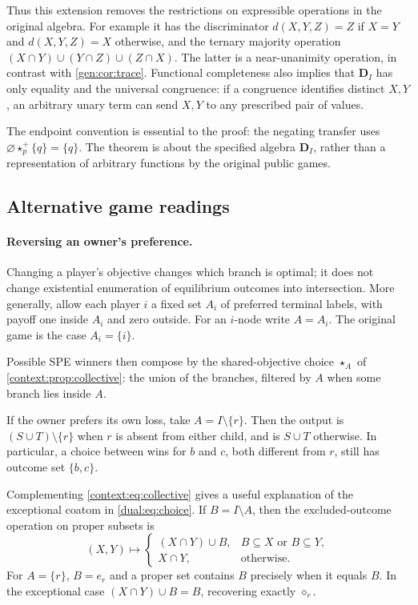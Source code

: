Thus this extension removes the restrictions on expressible operations
in the original algebra. For example it has the discriminator
$d(X,Y,Z)=Z$ if $X=Y$ and $d(X,Y,Z)=X$ otherwise, and the ternary
majority operation
$(X\cap Y)\cup(Y\cap Z)\cup(Z\cap X)$.
The latter is a near-unanimity operation, in contrast with
\cref{gen:cor:trace}. Functional completeness also implies that
$\mathbf D_I$ has only equality and the universal congruence: if a
congruence identifies distinct $X,Y$, an arbitrary unary term can
send $X,Y$ to any prescribed pair of values.

The endpoint convention is essential to the proof: the negating transfer
uses $\varnothing\star_p^+\{q\}=\{q\}$.
The theorem is about the specified algebra $\mathbf D_I$, rather than
a representation of arbitrary functions by the original public games.

\subsection{Alternative game readings}

\paragraph{Reversing an owner's preference.}
Changing a player's objective changes which branch is optimal; it does
not change existential enumeration of equilibrium outcomes into
intersection. More generally, allow each player $i$ a fixed set $A_i$
of preferred terminal labels, with payoff one inside $A_i$ and zero
outside. For an $i$-node write $A=A_i$. The original game is the case
$A_i=\{i\}$.

Possible SPE winners then compose by the shared-objective choice
$\star_A$ of \cref{context:prop:collective}: the union of the branches,
filtered by $A$ when some branch lies inside $A$.

If the owner prefers its own loss, take $A=I\setminus\{r\}$.
Then the output is $(S\cup T)\setminus\{r\}$ when $r$ is absent
from either child, and is $S\cup T$ otherwise. In particular, a
choice between wins for $b$ and $c$, both different from $r$, still
has outcome set $\{b,c\}$.

Complementing \eqref{context:eq:collective} gives a useful explanation of
the exceptional coatom in \eqref{dual:eq:choice}. If $B=I\setminus A$,
then the excluded-outcome operation on proper subsets is
\begin{equation}\label{dual:eq:objective-dual}
 (X,Y)\longmapsto
 \begin{cases}
 (X\cap Y)\cup B,&B\subseteq X\text{ or }B\subseteq Y,\\
 X\cap Y,&\text{otherwise}.
 \end{cases}
\end{equation}
For $A=\{r\}$, $B=e_r$ and a proper set contains $B$ precisely
when it equals $B$. In the exceptional case $(X\cap Y)\cup B=B$,
recovering exactly $\diamond_r$.


